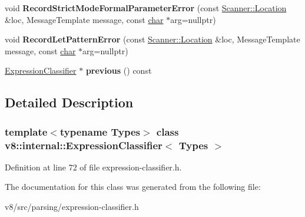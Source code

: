 \begin{DoxyCompactItemize}
\item 
\mbox{\label{classv8_1_1internal_1_1ExpressionClassifier_aaaac2341264af2ab27e28568866d4048}} 
void {\bfseries Record\+Strict\+Mode\+Formal\+Parameter\+Error} (const \mbox{\hyperlink{structv8_1_1internal_1_1Scanner_1_1Location}{Scanner\+::\+Location}} \&loc, Message\+Template message, const \mbox{\hyperlink{classchar}{char}} $\ast$arg=nullptr)
\item 
\mbox{\label{classv8_1_1internal_1_1ExpressionClassifier_a2737588cf49401a55c80cac8b824bdfb}} 
void {\bfseries Record\+Let\+Pattern\+Error} (const \mbox{\hyperlink{structv8_1_1internal_1_1Scanner_1_1Location}{Scanner\+::\+Location}} \&loc, Message\+Template message, const \mbox{\hyperlink{classchar}{char}} $\ast$arg=nullptr)
\item 
\mbox{\label{classv8_1_1internal_1_1ExpressionClassifier_a0f630c0ee25dae4a48f697b3014f328b}} 
\mbox{\hyperlink{classv8_1_1internal_1_1ExpressionClassifier}{Expression\+Classifier}} $\ast$ {\bfseries previous} () const
\end{DoxyCompactItemize}


\subsection{Detailed Description}
\subsubsection*{template$<$typename Types$>$\newline
class v8\+::internal\+::\+Expression\+Classifier$<$ Types $>$}



Definition at line 72 of file expression-\/classifier.\+h.



The documentation for this class was generated from the following file\+:\begin{DoxyCompactItemize}
\item 
v8/src/parsing/expression-\/classifier.\+h\end{DoxyCompactItemize}
